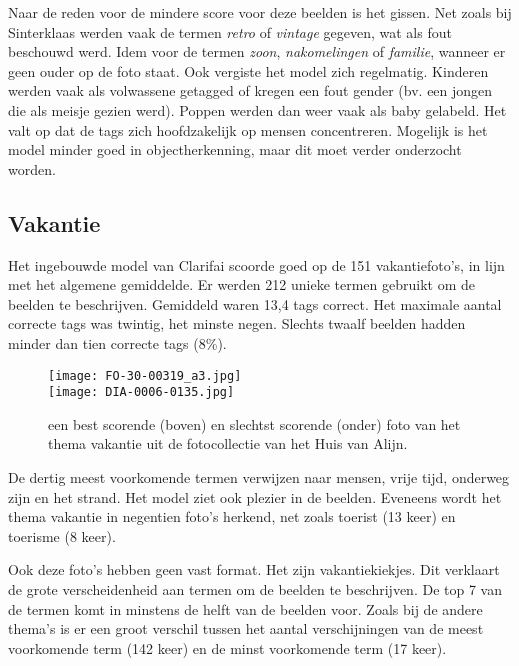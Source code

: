 Naar de reden voor de mindere score voor deze beelden is het gissen. Net zoals bij Sinterklaas werden vaak de termen \textit{retro} of \textit{vintage} gegeven, wat als fout beschouwd werd. Idem voor de termen \textit{zoon}, \textit{nakomelingen} of \textit{familie}, wanneer er geen ouder op de foto staat. Ook vergiste het model zich regelmatig. Kinderen werden vaak als volwassene getagged of kregen een fout gender (bv. een jongen die als meisje gezien werd). Poppen werden dan weer vaak als baby gelabeld. Het valt op dat de tags zich hoofdzakelijk op mensen concentreren. Mogelijk is het model minder goed in objectherkenning, maar dit moet verder onderzocht worden.

\subsection{Vakantie}

Het ingebouwde model van Clarifai scoorde goed op de 151 vakantiefoto’s, in lijn met het algemene gemiddelde.  Er werden 212 unieke termen gebruikt om de beelden te beschrijven. Gemiddeld waren 13,4 tags correct. Het maximale aantal correcte tags was twintig, het minste negen. Slechts twaalf beelden hadden minder dan tien correcte tags (8\%).

\begin{figure}
	\centering
	\texttt{[image: FO-30-00319\_a3.jpg]}\hfill
	\\[\smallskipamount]
	\texttt{[image: DIA-0006-0135.jpg]}\hfill
	\caption[Best en slechtst scorende foto van thema vakantie]{een best scorende (boven) en slechtst scorende (onder) foto van het thema vakantie uit de fotocollectie van het Huis van Alijn.}
\end{figure}

De dertig meest voorkomende termen verwijzen naar mensen, vrije tijd, onderweg zijn en het strand. Het model ziet ook plezier in de beelden. Eveneens wordt het thema vakantie in negentien foto’s herkend, net zoals toerist (13 keer) en toerisme (8 keer).

Ook deze foto’s hebben geen vast format. Het zijn vakantiekiekjes. Dit verklaart de grote verscheidenheid aan termen om de beelden te beschrijven. De top 7 van de termen komt in minstens de helft van de beelden voor. Zoals bij de andere thema’s is er een groot verschil tussen het aantal verschijningen van de meest voorkomende term (142 keer) en de minst voorkomende term (17 keer). 


